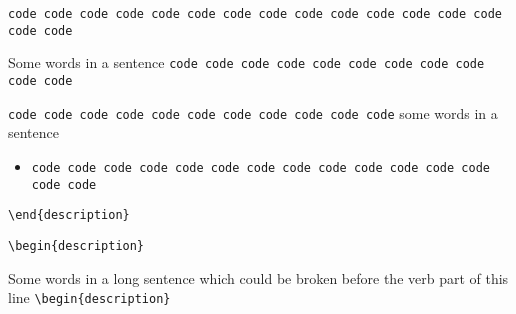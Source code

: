 


\verb|code code code code code code code code code code code code code code code code|


Some words in a sentence \verb|code code code code code code code code code code code|

\verb|code code code code code code code code code code code| some words in a sentence


\begin{itemize}
  \item
    \verb|code code code code code code code code code code code code code code code|
\end{itemize}


\verb|\end{description}|

\verb|\begin{description}|


Some words in a long sentence which could be broken before the verb part of this line \verb|\begin{description}|


\verb|     |



